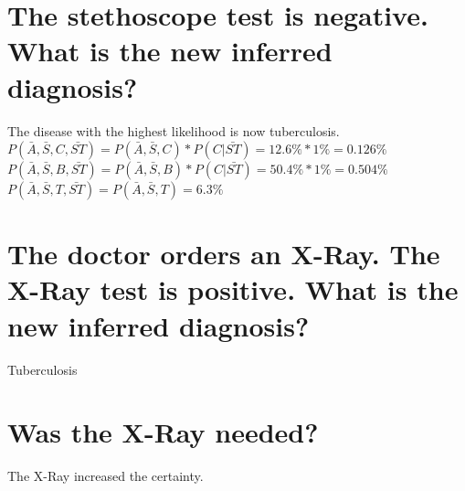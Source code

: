 \documentclass[12pt]{article}
\begin{document}
\section*{The stethoscope test is negative. What is the new inferred diagnosis?}
The disease with the highest likelihood is now tuberculosis.\\
$ P(\bar{A}, \bar{S}, C, \bar{ST}) = P(\bar{A}, \bar{S}, C) * P(C | \bar{ST}) = 12.6\% * 1\% = 0.126\% $\\
$ P(\bar{A}, \bar{S}, B, \bar{ST}) = P(\bar{A}, \bar{S}, B) * P(C | \bar{ST}) = 50.4\% * 1\% = 0.504\% $\\
$P(\bar{A}, \bar{S}, T, \bar{ST}) = P(\bar{A}, \bar{S}, T) = 6.3\%$
\section{The doctor orders an X-Ray. The X-Ray test is positive. What is the new inferred diagnosis?}
Tuberculosis
\section{Was the X-Ray needed?}
The X-Ray increased the certainty.
\end{document}
